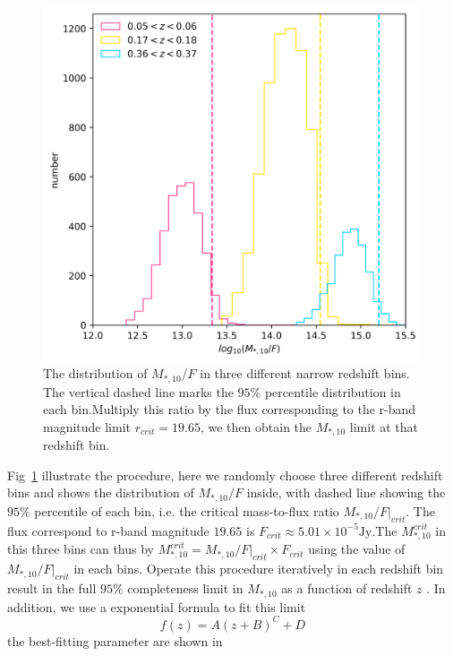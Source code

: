 \documentclass[fleqn,usenatbib]{mnras}
\begin{document}
\begin{figure}
    \centering
    \includegraphics[width=\linewidth]{figure/m2f_ratio.png}
    \caption{The distribution of $M_{*,10} / F$ in three different narrow redshift bins. The vertical dashed line marks the $95\%$ percentile distribution in each bin.Multiply this ratio by the flux corresponding to the r-band magnitude limit $r_{crit} = 19.65$, we then obtain the $M_{*,10}$ limit at that redshift bin.}
    \label{fig:m2f}
\end{figure}
\par Fig~\ref{fig:m2f} illustrate the procedure, here we randomly choose three different redshift bins and shows the distribution of $M_{*,10} / F$ inside, with dashed line showing the $95\%$ percentile of each bin, i.e. the critical mass-to-flux ratio $M_{*,10}/F|_{crit}$. The flux correspond to r-band magnitude $19.65$ is $F_{crit} \approx  5.01 \times 10^{-5} \text{Jy} $.The $M^{crit}_{*,10} $ in this three bins can thus by $M^{crit}_{*,10} = M_{*,10}/F|_{crit} \times F_{crit} $ using the value of $M_{*,10}/F|_{crit}$ in each bins.  Operate this procedure iteratively in each redshift bin result in the full $95\%$ completeness limit in $M_{*,10}$ as a function of redshift $z$ . In addition, we use a exponential formula to fit this limit
\begin{equation}
    f(z) = A(z+B)^C + D
\end{equation}
the best-fitting parameter are shown in 
\end{document}
